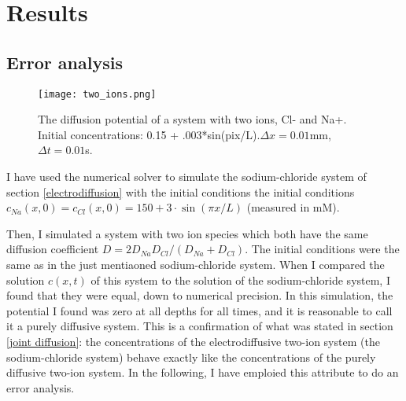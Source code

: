 \documentclass{article}
\begin{document}
\section{Results}
\subsection{Error analysis}\label{numerical vs analytical}

\begin{figure}
  \texttt{[image: two\_ions.png]}
  \caption{The diffusion potential of a system with two ions, Cl- and Na+. Initial concentrations: 0.15 + .003*sin(pix/L).$\Delta x = 0.01$mm, $\Delta t = 0.01 $s. }
  \label{fig:two_ions}
\end{figure}

I have used the numerical solver to simulate the sodium-chloride system of section \ref{electrodiffusion} with  the initial conditions the initial conditions $c_{Na}(x,0)=c_{Cl}(x,0)=150+3\cdot \sin(\pi x/L)$ (measured in mM). 

Then, I simulated a system with two ion species which both have the same diffusion coefficient $D=2D_{Na}D_{Cl}/(D_{Na}+D_{Cl})$. The initial conditions were the same as in the just mentiaoned sodium-chloride system. When I compared the solution $c(x,t)$ of this system to the solution of the sodium-chloride system, I found that they were equal, down to numerical precision. In this simulation, the potential I found was zero at all depths for all times, and it is reasonable to call it a purely diffusive system. This is a confirmation of what was stated in section \ref{joint diffusion}: the concentrations of the electrodiffusive two-ion system (the sodium-chloride system) behave exactly like the concentrations of the purely diffusive two-ion system. In the following, I have emploied this attribute to do an error analysis. 
\end{document}
